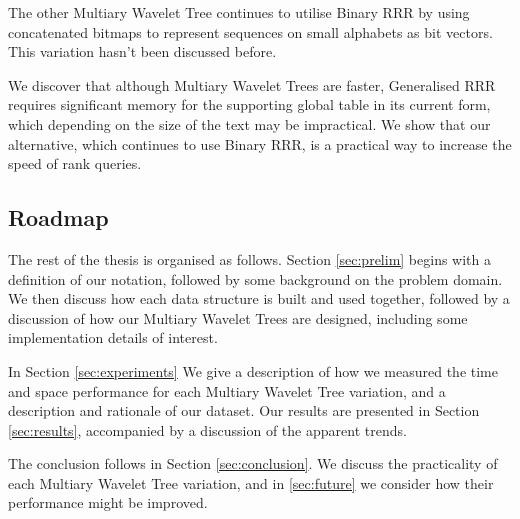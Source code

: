 The other Multiary Wavelet Tree continues to utilise Binary RRR by using 
concatenated bitmaps to represent sequences on small alphabets as bit vectors.
This variation hasn't been discussed before.

We discover that although Multiary Wavelet Trees are faster, Generalised RRR 
requires significant memory for the supporting global table in its current form, 
which depending on the size of the text may be impractical. We show that our 
alternative, which continues to use Binary RRR, is a practical way to increase 
the speed of rank queries.


\subsection{Roadmap}

The rest of the thesis is organised as follows. Section \ref{sec:prelim} begins 
with a definition of our notation, followed by some background on the problem 
domain. We then discuss how each data structure is built and used together, 
followed by a discussion of how our Multiary Wavelet Trees are designed, 
including some implementation details of interest.

In Section \ref{sec:experiments} We give a description of how we measured the 
time and space performance for each Multiary Wavelet Tree variation,
and a description and rationale of our dataset. Our results are presented in 
Section \ref{sec:results}, accompanied by a discussion of the apparent trends.

The conclusion follows in Section \ref{sec:conclusion}. We discuss the 
practicality of each Multiary Wavelet Tree variation, and in \ref{sec:future} we 
consider how their performance might be improved.



